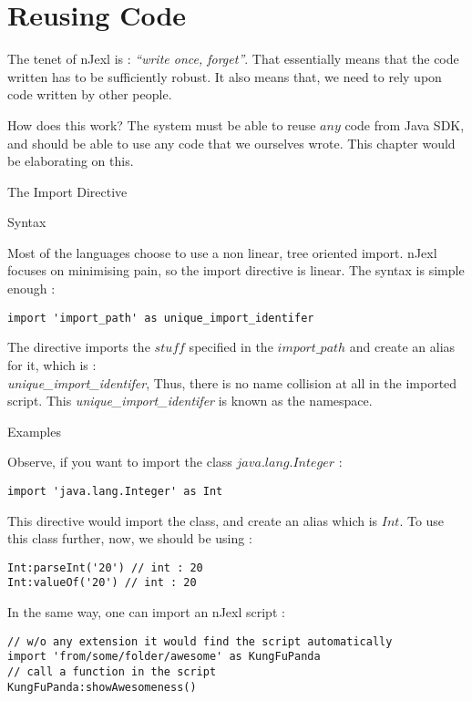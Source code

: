 \chapter{Reusing Code}\label{code-reuse}

{\LARGE T}he tenet of nJexl is : \emph{``write once, forget''}.
That essentially means that the code written has to be sufficiently robust.
It also means that, we need to rely upon code written by other people.

How does this work? The system must be able to reuse $any$ code 
from Java SDK, and should be able to use any code that we ourselves wrote.
This chapter would be elaborating on this.

\begin{section}{The Import Directive}

\begin{subsection}{Syntax}

Most of the languages choose to use a non linear, tree oriented import.
nJexl focuses on minimising pain, so the import directive is linear.
The syntax is simple enough :
\begin{lstlisting}[style=JexlStyle]
import 'import_path' as unique_import_identifer
\end{lstlisting}

The directive imports the $stuff$ specified in the $import\_path$ and create 
an alias for it, which is : \\ \emph{unique\_import\_identifer},
Thus, there is no name collision at all in the imported script.
This \emph{unique\_import\_identifer} is known as the namespace.

\end{subsection}

 
\begin{subsection}{Examples}

Observe, if you want to import the class $java.lang.Integer$ :

\begin{lstlisting}[style=JexlStyle]
import 'java.lang.Integer' as Int
\end{lstlisting}

This directive would import the class, and create an alias which is $Int$.
To use this class further, now, we should be using :

\begin{lstlisting}[style=JexlStyle]
Int:parseInt('20') // int : 20
Int:valueOf('20') // int : 20 
\end{lstlisting}

In the same way, one can import an nJexl script :

\begin{lstlisting}[style=JexlStyle]
// w/o any extension it would find the script automatically 
import 'from/some/folder/awesome' as KungFuPanda
// call a function in the script 
KungFuPanda:showAwesomeness()
\end{lstlisting}

\end{subsection}
 
\end{section}

